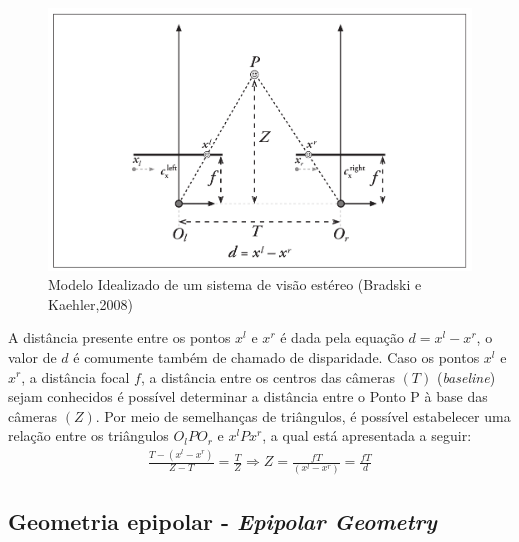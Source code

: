 \begin{figure}[H]
 	\centering
 	\includegraphics[scale=0.35]{./Resources/stereo_image_geometric_model.png}
 	\caption{Modelo Idealizado de um sistema de visão estéreo (Bradski e Kaehler,2008)}
 	\label{stereo_image_geometric_model}
\end{figure}

A distância presente entre os pontos $x^l$ e $x^r$ é dada pela equação $d = x^l - x^r$, o valor de $d$ é comumente também de chamado de disparidade. Caso os pontos $x^l$ e $x^r$, a distância focal $f$, a distância entre os centros das câmeras $(T)$ (\textit{baseline}) sejam conhecidos é possível determinar a distância entre o Ponto P à base das câmeras $(Z)$. Por meio de semelhanças de triângulos, é possível estabelecer uma relação entre os triângulos $O_lPO_r$ e $x^lPx^r$, a qual está apresentada a seguir:
\begin{align*}
\frac{T - (x^l-x^r)}{Z-T} = \frac{T}{Z} \Rightarrow Z = \frac{fT}{(x^l-x^r)} = \frac{fT}{d}
\end{align*}


\subsection{Geometria epipolar - \textit{Epipolar Geometry}}


